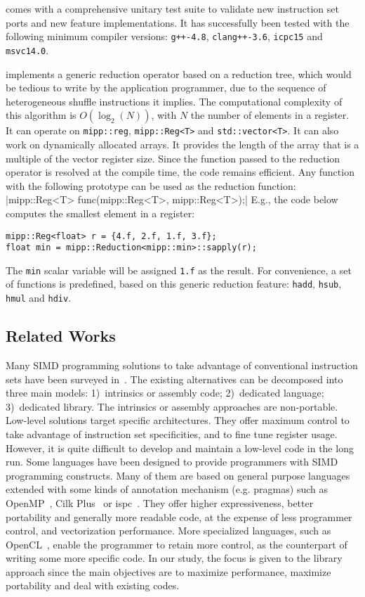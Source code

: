 \MIPP comes with a comprehensive unitary test suite to validate new instruction
set ports and new feature implementations. It has successfully been tested with
the following minimum compiler versions: \verb|g++-4.8|, \verb|clang++-3.6|,
\verb|icpc15| and \verb|msvc14.0|.

\MIPP implements a generic reduction operator based on a reduction tree, which
would be tedious to write by the application programmer, due to the sequence of
heterogeneous shuffle instructions it implies. The computational complexity of
this algorithm is $O(\log_2(N))$, with $N$ the number of elements in a register.
It can operate on \verb|mipp::reg|, \verb|mipp::Reg<T>| and
\verb|std::vector<T>|. It can also work on dynamically allocated arrays. It
provides the length of the array that is a multiple of the vector register size.
Since the function passed to the reduction operator is resolved at the compile
time, the code remains efficient. Any function with the following prototype can
be used as the reduction function:
|mipp::Reg<T> func(mipp::Reg<T>, mipp::Reg<T>);|
{\noindent
E.g., the code below computes the smallest element in a register:
}
\begin{verbatim}
mipp::Reg<float> r = {4.f, 2.f, 1.f, 3.f};
float min = mipp::Reduction<mipp::min>::sapply(r);
\end{verbatim}
The \verb|min| scalar variable will be assigned \verb|1.f| as the result. For
convenience, a set of functions is predefined, based on this generic reduction
feature: \verb|hadd|, \verb|hsub|, \verb|hmul| and \verb|hdiv|.

\subsection{Related Works}

Many SIMD programming solutions to take advantage of conventional instruction
sets have been surveyed in~\cite{Pohl2016}. The existing alternatives can be
decomposed into three main models: 1)~intrinsics or assembly code; 2)~dedicated
language; 3)~dedicated library. The intrinsics or assembly approaches are
non-portable. Low-level solutions target specific architectures. They offer
maximum control to take advantage of instruction set specificities, and to fine
tune register usage. However, it is quite difficult to develop and maintain a
low-level code in the long run. Some languages have been designed to provide
programmers with SIMD programming constructs. Many of them are based on general
purpose languages extended with some kinds of annotation mechanism (e.g.
pragmas) such as OpenMP~\cite{OpenMP2013}, Cilk Plus~\cite{Robison2013} or
ispc~\cite{Pharr2012}. They offer higher expressiveness, better portability and
generally more readable code, at the expense of less programmer control, and
vectorization performance. More specialized languages, such as
OpenCL~\cite{Howes2015}, enable the programmer to retain more control, as the
counterpart of writing some more specific code. In our study, the focus is given
to the library approach since the main objectives are to maximize performance,
maximize portability and deal with existing \Cxx codes.

